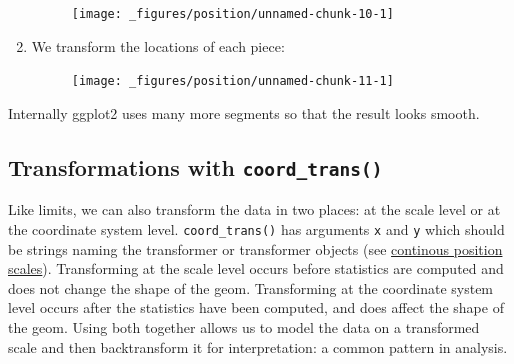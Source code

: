 \begin{enumerate}
  \begin{figure}[H]
    \centering
    \texttt{[image: \_figures/position/unnamed-chunk-10-1]}
  \end{figure}
\item
  We transform the locations of each piece:

\begin{Shaded}
\begin{Highlighting}[]
\StringTok{ }
   \StringTok{ }
   \StringTok{ }
\NormalTok{)}

\StringTok{ }
\StringTok{  }\NormalTok{() +}\StringTok{ }
\StringTok{  }\NormalTok{(} \NormalTok{, } \NormalTok{) +}\StringTok{ }
\StringTok{  }\NormalTok{()}
\end{Highlighting}
\end{Shaded}

  \begin{figure}[H]
    \centering
    \texttt{[image: \_figures/position/unnamed-chunk-11-1]}
  \end{figure}
\end{enumerate}

Internally ggplot2 uses many more segments so that the result looks
smooth.

\subsection{\texorpdfstring{Transformations with
\texttt{coord\_trans()}}{Transformations with coord\_trans()}}\label{transformations-with-coordux5ftrans}

Like limits, we can also transform the data in two places: at the scale
level or at the coordinate system level. \texttt{coord\_trans()} has
arguments \texttt{x} and \texttt{y} which should be strings naming the
transformer or transformer objects (see
\protect\hyperlink{sub:scale-position}{continous position scales}).
Transforming at the scale level occurs before statistics are computed
and does not change the shape of the geom. Transforming at the
coordinate system level occurs after the statistics have been computed,
and does affect the shape of the geom. Using both together allows us to
model the data on a transformed scale and then backtransform it for
interpretation: a common pattern in analysis.
 

